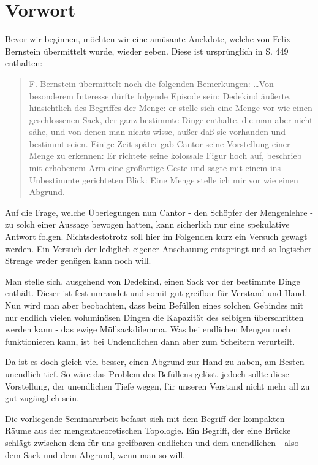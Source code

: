 \chapter{Vorwort}
Bevor wir beginnen, möchten wir eine amüsante Anekdote, welche von Felix Bernstein übermittelt 
wurde, wieder geben. Diese ist ursprünglich in \cite{book:dedekind} S. 449 enthalten:

\begin{quote}
\glqq F. Bernstein übermittelt noch die folgenden Bemerkungen:
\glq \dots Von besonderem Interesse dürfte folgende Episode sein: Dedekind äußerte, hinsichtlich 
des Begriffes der Menge: er stelle sich eine Menge vor wie einen geschlossenen
Sack, der ganz bestimmte Dinge enthalte, die man aber nicht sähe, und von denen man
nichts wisse, außer daß sie vorhanden und bestimmt seien. Einige Zeit später gab Cantor
seine Vorstellung einer Menge zu erkennen: Er richtete seine kolossale Figur hoch auf,
beschrieb mit erhobenem Arm eine großartige Geste und sagte mit einem ins Unbestimmte 
gerichteten Blick: \glq Eine Menge stelle ich mir vor wie einen Abgrund.\grq \grq \grqq
\end{quote}

Auf die Frage, welche Überlegungen nun Cantor - den Schöpfer der Mengenlehre - 
zu solch einer Aussage bewogen hatten, kann sicherlich nur eine spekulative Antwort folgen.
Nichtsdestotrotz soll hier im Folgenden kurz ein Versuch gewagt werden. Ein Versuch der lediglich
eigener Anschauung entspringt und so logischer Strenge weder genügen kann noch will.

Man stelle sich, ausgehend von Dedekind, einen Sack vor der bestimmte Dinge enthält.
Dieser ist fest umrandet und somit gut greifbar für Verstand und Hand. Nun wird man
aber beobachten, dass beim Befüllen eines solchen Gebindes mit nur endlich vielen voluminösen Dingen 
die Kapazität des selbigen überschritten werden kann - das ewige \glqq Müllsackdilemma\grqq .
Was bei endlichen Mengen noch funktionieren kann, ist bei Undendlichen dann aber zum Scheitern verurteilt.

Da ist es doch gleich viel besser, einen Abgrund zur Hand zu haben, am Besten unendlich tief. So wäre
das Problem des Befüllens gelöst, jedoch sollte diese Vorstellung, der unendlichen Tiefe wegen, für unseren
Verstand nicht mehr all zu gut zugänglich sein.

Die vorliegende Seminararbeit befasst sich mit dem Begriff der kompakten Räume aus der mengentheoretischen
Topologie. Ein Begriff, der eine Brücke schlägt zwischen dem für uns greifbaren endlichen und dem
unendlichen - also dem Sack und dem Abgrund, wenn man so will.

